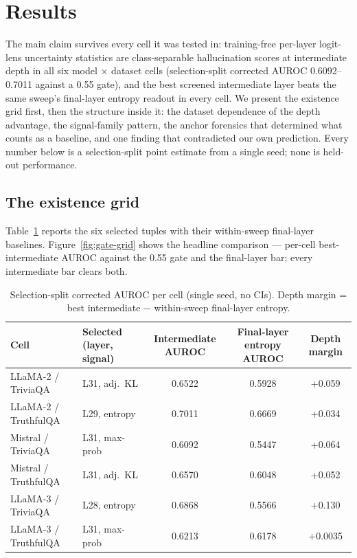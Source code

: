 \section{Results}
\label{sec:results}

The main claim survives every cell it was tested in: training-free per-layer logit-lens uncertainty statistics are class-separable hallucination scores at intermediate depth in all six model $\times$ dataset cells (selection-split corrected AUROC 0.6092--0.7011 against a 0.55 gate), and the best screened intermediate layer beats the same sweep's final-layer entropy readout in every cell. We present the existence grid first, then the structure inside it: the dataset dependence of the depth advantage, the signal-family pattern, the anchor forensics that determined what counts as a baseline, and one finding that contradicted our own prediction. Every number below is a selection-split point estimate from a single seed; none is held-out performance.

\subsection{The existence grid}
\label{sec:existence-grid}

Table~\ref{tab:existence-grid} reports the six selected tuples with their within-sweep final-layer baselines. Figure~\ref{fig:gate-grid} shows the headline comparison --- per-cell best-intermediate AUROC against the 0.55 gate and the final-layer bar; every intermediate bar clears both.

\begin{table}[t]
\centering
\caption{Selection-split corrected AUROC per cell (single seed, no CIs). Depth margin = best intermediate $-$ within-sweep final-layer entropy.}
\label{tab:existence-grid}
\begin{tabular}{llccc}
\toprule
Cell & Selected (layer, signal) & Intermediate AUROC & Final-layer entropy AUROC & Depth margin \\
\midrule
LLaMA-2 / TriviaQA & L31, adj.\ KL & 0.6522 & 0.5928 & +0.059 \\
LLaMA-2 / TruthfulQA & L29, entropy & 0.7011 & 0.6669 & +0.034 \\
Mistral / TriviaQA & L31, max-prob & 0.6092 & 0.5447 & +0.064 \\
Mistral / TruthfulQA & L31, adj.\ KL & 0.6570 & 0.6048 & +0.052 \\
LLaMA-3 / TriviaQA & L28, entropy & 0.6868 & 0.5566 & +0.130 \\
LLaMA-3 / TruthfulQA & L31, max-prob & 0.6213 & 0.6178 & +0.0035 \\
\bottomrule
\end{tabular}
\end{table}

